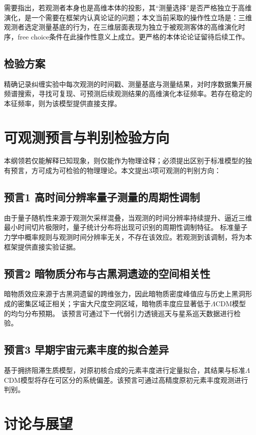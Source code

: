 \documentclass[UTF8]{csoarticle}
\begin{document}
需要指出，若观测者本身也是高维本体的投影，其“测量选择”是否严格独立于高维演化，是一个需要在框架内认真论证的问题；本文当前采取的操作性立场是：三维观测者选定测量基底的行为，在三维层面表现为独立于被观测客体的高维演化时序，free choice条件在此操作性意义上成立。更严格的本体论论证留待后续工作。

\subsection{检验方案}
精确记录纠缠实验中每次观测的时间戳、测量基底与测量结果，对时序数据集开展频谱搜索，寻找可复现、可预测后续观测结果的高维演化本征频率。若存在稳定的本征频率，则为该模型提供直接支撑。

\section{可观测预言与判别检验方向}
本纲领若仅能解释已知现象，则仅能作为物理诠释；必须提出区别于标准模型的独有预言，方可成为可检验的物理理论。本文提出3项可观测的判别方向：

\subsection{预言1 高时间分辨率量子测量的周期性调制}
由于量子随机性来源于观测欠采样混叠，当观测的时间分辨率持续提升、逼近三维最小时间切片极限时，量子统计分布将出现可识别的周期性调制特征。
标准量子力学中概率规则与观测时间分辨率无关，不存在该效应。若观测到该调制，将为本框架提供直接实验证据。

\subsection{预言2 暗物质分布与古黑洞遗迹的空间相关性}
暗物质效应来源于古黑洞遗留的跨维张力，因此暗物质密度峰值应与历史上黑洞形成的密集区域正相关；宇宙大尺度空洞区域，暗物质丰度应显著低于$\Lambda$CDM模型的均匀分布预期。
该预言可通过下一代弱引力透镜巡天与星系巡天数据进行检验。

\subsection{预言3 早期宇宙元素丰度的拟合差异}
基于拥挤阻滞生质模型，对原初核合成的元素丰度进行定量拟合，其结果与标准$\Lambda$CDM模型将存在可区分的系统偏差。该预言可通过高精度原初元素丰度观测进行判别。

\section{讨论与展望}
\end{document}
